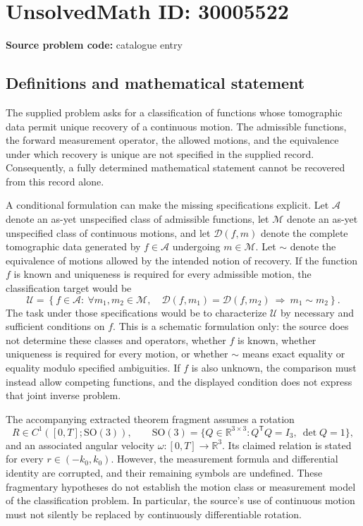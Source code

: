 \documentclass[11pt]{article}
\newcommand{\R}{\mathbb{R}}
\begin{document}
\section*{UnsolvedMath ID: 30005522}
\textbf{Source problem code:} catalogue entry
\subsection{Definitions and mathematical statement}
The supplied problem asks for a classification of functions whose tomographic data permit unique recovery of a continuous motion. The admissible functions, the forward measurement operator, the allowed motions, and the equivalence under which recovery is unique are not specified in the supplied record. Consequently, a fully determined mathematical statement cannot be recovered from this record alone.

A conditional formulation can make the missing specifications explicit. Let \(\mathcal A\) denote an as-yet unspecified class of admissible functions, let \(\mathcal M\) denote an as-yet unspecified class of continuous motions, and let \(\mathcal D(f,m)\) denote the complete tomographic data generated by \(f\in\mathcal A\) undergoing \(m\in\mathcal M\). Let \(\sim\) denote the equivalence of motions allowed by the intended notion of recovery. If the function \(f\) is known and uniqueness is required for every admissible motion, the classification target would be
\[
\mathcal U=\left\{f\in\mathcal A:\ \forall m_1,m_2\in\mathcal M,\quad \mathcal D(f,m_1)=\mathcal D(f,m_2)\ \Longrightarrow\ m_1\sim m_2\right\}.
\]
The task under those specifications would be to characterize \(\mathcal U\) by necessary and sufficient conditions on \(f\). This is a schematic formulation only: the source does not determine these classes and operators, whether \(f\) is known, whether uniqueness is required for every motion, or whether \(\sim\) means exact equality or equality modulo specified ambiguities. If \(f\) is also unknown, the comparison must instead allow competing functions, and the displayed condition does not express that joint inverse problem.

The accompanying extracted theorem fragment assumes a rotation
\[
R\in C^1([0,T];\mathrm{SO}(3)),\qquad
\mathrm{SO}(3)=\{Q\in\R^{3\times3}:Q^{\mathsf T}Q=I_3,\ \det Q=1\},
\]
and an associated angular velocity \(\omega:[0,T]\to\R^3\). Its claimed relation is stated for every \(r\in(-k_0,k_0)\). However, the measurement formula and differential identity are corrupted, and their remaining symbols are undefined. These fragmentary hypotheses do not establish the motion class or measurement model of the classification problem. In particular, the source's use of continuous motion must not silently be replaced by continuously differentiable rotation.
\end{document}
